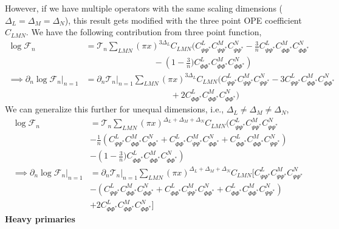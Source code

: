 \documentclass[11pt]{article}
\newcommand{\p}{\partial}
\newcommand{\nn}{\nonumber}
\newcommand{\lb}{\left(}
\newcommand{\rb}{\right)}
\begin{document}
However, if we have multiple operators with the same scaling dimensions ($\Delta_L = \Delta_M= \Delta_N$), this result gets modified with the three point OPE coefficient $C_{LMN}$. We have the following contribution from three point function,
\begin{align}
    \log \mathcal{F}_n &= \mathcal{T}_n \sum_{LMN}(\pi x)^{3\Delta_L} C_{LMN} \Big( C_{\Psi\Psi^*}^LC_{\Psi\Psi^*}^MC_{\Psi\Psi^*}^N - \frac{3}{n} C_{\Psi\Psi^*}^LC_{\Phi\Phi^*}^MC_{\Phi\Phi^*}^N \nn \\
    &\qquad \qquad \qquad \qquad - \lb1-\frac{3}{n}\Big) C_{\Phi\Phi^*}^LC_{\Phi\Phi^*}^MC_{\Phi\Phi^*}^N \rb \\ 
    \implies  \p_n \log \mathcal{F}_n |_{n=1} &= \p_n \mathcal{T}_n|_{n=1} \sum_{LMN}(\pi x)^{3\Delta_L} C_{LMN} \Big(C_{\Psi\Psi^*}^LC_{\Psi\Psi^*}^MC_{\Psi\Psi^*}^N - 3 C_{\Psi\Psi^*}^LC_{\Phi\Phi^*}^MC_{\Phi\Phi^*}^N \nn \\
    &\qquad \qquad \qquad \qquad \qquad  +2C_{\Phi\Phi^*}^LC_{\Phi\Phi^*}^MC_{\Phi\Phi^*}^N \Big)
\end{align}
We can generalize this further for unequal dimensions, i.e., $\Delta_L \neq \Delta_M \neq \Delta_N$,
\begin{align}
    \log \mathcal{F}_n &= \mathcal{T}_n \sum_{LMN}(\pi x)^{\Delta_L+ \Delta_M + \Delta_N} C_{LMN} \Big( C_{\Psi\Psi^*}^LC_{\Psi\Psi^*}^MC_{\Psi\Psi^*}^N \nn \\&- \frac{1}{n} \lb C_{\Psi\Psi^*}^LC_{\Phi\Phi^*}^MC_{\Phi\Phi^*}^N + C_{\Phi\Phi^*}^LC_{\Psi\Psi^*}^MC_{\Phi\Phi^*}^N+C_{\Phi\Phi^*}^LC_{\Phi\Phi^*}^MC_{\Psi\Psi^*}^N\rb\nn \\
    &
    - \lb1-\frac{3}{n}\Big) C_{\Phi\Phi^*}^LC_{\Phi\Phi^*}^MC_{\Phi\Phi^*}^N \rb\\
    \implies \p_n \log \mathcal{F}_n|_{n=1} &= \p_n \mathcal{T}_n|_{n=1} \sum_{LMN}(\pi x)^{\Delta_L+ \Delta_M + \Delta_N} C_{LMN} \Big[ C_{\Psi\Psi^*}^LC_{\Psi\Psi^*}^MC_{\Psi\Psi^*}^N \nn \\&- \lb C_{\Psi\Psi^*}^LC_{\Phi\Phi^*}^MC_{\Phi\Phi^*}^N + C_{\Phi\Phi^*}^LC_{\Psi\Psi^*}^MC_{\Phi\Phi^*}^N+C_{\Phi\Phi^*}^LC_{\Phi\Phi^*}^MC_{\Psi\Psi^*}^N\rb\nn \\
    &
    +2 C_{\Phi\Phi^*}^LC_{\Phi\Phi^*}^MC_{\Phi\Phi^*}^N \Big]
\end{align}
\textbf{Heavy primaries}
\end{document}
